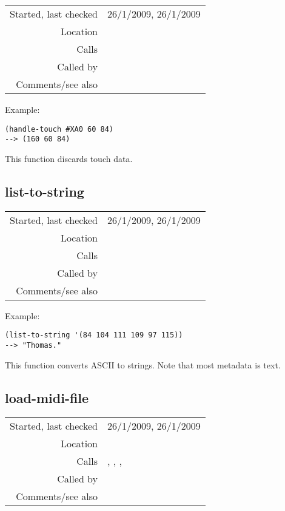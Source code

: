 \vspace{0.3cm}
\begin{tabular}{r|p{8cm}}
Started, last checked & 26/1/2009, 26/1/2009 \\
Location & \nameref{sec:MIDI-import} \\
Calls & \\
Called by & \nameref{fun:parse-events} \\
Comments/see also &
\end{tabular}

\vspace{0.5cm}
\noindent Example:
\begin{verbatim}
(handle-touch #XA0 60 84)
--> (160 60 84)
\end{verbatim}

\noindent This function discards touch data.


\subsection*{list-to-string}\label{fun:list-to-string}

\vspace{0.3cm}
\begin{tabular}{r|p{8cm}}
Started, last checked & 26/1/2009, 26/1/2009 \\
Location & \nameref{sec:MIDI-import} \\
Calls & \\
Called by & \nameref{fun:parse-metadata} \\
Comments/see also &
\end{tabular}

\vspace{0.5cm}
\noindent Example:
\begin{verbatim}
(list-to-string '(84 104 111 109 97 115))
--> "Thomas."
\end{verbatim}

\noindent This function converts ASCII to strings.
Note that most metadata is text.


\subsection*{load-midi-file}\label{fun:load-midi-file}

\vspace{0.3cm}
\begin{tabular}{r|p{8cm}}
Started, last checked & 26/1/2009, 26/1/2009 \\
Location & \nameref{sec:MIDI-import} \\
Calls & \nameref{fun:earlier}, \nameref{fun:get-header}, \nameref{fun:read-track}, \nameref{fun:setup} \\
Called by & \\
Comments/see also &
\end{tabular}

